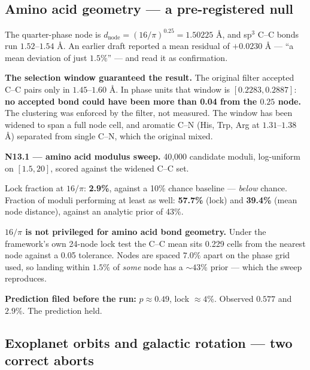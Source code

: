 \documentclass[11pt, letterpaper, openany]{book}
\begin{document}
\subsection*{Amino acid geometry --- a pre-registered null}

The quarter-phase node is $d_{\text{node}} = (16/\pi)^{0.25} = 1.50225$ \AA, and sp$^3$ C--C bonds
run $1.52$--$1.54$ \AA. An earlier draft reported a mean residual of $+0.0230$ \AA{} --- ``a mean
deviation of just $1.5\%$'' --- and read it as confirmation.

\begin{correctionbox}
\textbf{The selection window guaranteed the result.} The original filter accepted C--C pairs only in
$1.45$--$1.60$ \AA. In phase units that window is $[0.2283, 0.2887]$: \textbf{no accepted bond could
have been more than 0.04 from the $0.25$ node.} The clustering was enforced by the filter, not
measured. The window has been widened to span a full node cell, and aromatic C--N (His, Trp, Arg at
$1.31$--$1.38$ \AA) separated from single C--N, which the original mixed.
\end{correctionbox}

\begin{nullbox}
\textbf{N13.1 --- amino acid modulus sweep.} 40{,}000 candidate moduli, log-uniform on $[1.5, 20]$,
scored against the widened C--C set.

\medskip
Lock fraction at $16/\pi$: \textbf{2.9\%}, against a 10\% chance baseline --- \emph{below} chance.
Fraction of moduli performing at least as well: \textbf{57.7\%} (lock) and \textbf{39.4\%} (mean node
distance), against an analytic prior of 43\%.

\medskip
\textbf{$16/\pi$ is not privileged for amino acid bond geometry.} Under the framework's own 24-node
lock test the C--C mean sits 0.229 cells from the nearest node against a 0.05 tolerance. Nodes are
spaced $7.0\%$ apart on the phase grid used, so landing within $1.5\%$ of \emph{some} node has a
$\sim 43\%$ prior --- which the sweep reproduces.

\medskip
\textbf{Prediction filed before the run:} $p \approx 0.49$, lock $\approx 4\%$. Observed $0.577$ and
$2.9\%$. The prediction held.
\end{nullbox}

\subsection*{Exoplanet orbits and galactic rotation --- two correct aborts}
\end{document}
